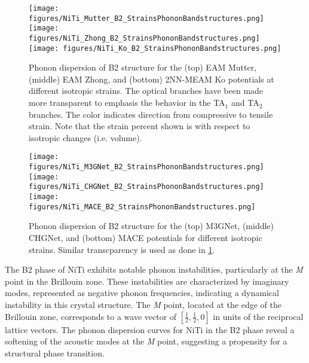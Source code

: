 \documentclass[preprint]{elsarticle}
\begin{document}
\begin{figure}[!htp]
    \begin{centering}
        \texttt{[image: figures/NiTi\_Mutter\_B2\_StrainsPhononBandstructures.png]}
        \vspace{1mm}
        \texttt{[image: figures/NiTi\_Zhong\_B2\_StrainsPhononBandstructures.png]}
        \vspace{1mm}
        \texttt{[image: figures/NiTi\_Ko\_B2\_StrainsPhononBandstructures.png]}
        \caption{
           Phonon dispersion of B2 structure for the  (top) EAM Mutter, (middle) EAM Zhong, and (bottom) 2NN-MEAM Ko potentials at different isotropic strains. The optical branches have been made more transparent to emphasis the behavior in the TA$_1$ and TA$_2$ branches. The color indicates direction from compressive to tensile strain. Note that the strain percent shown is with respect to isotropic changes (i.e. volume). 
        }
        \label{fig:mutter_zhong_phonon_b2}
    \end{centering}
\end{figure}



\begin{figure}[!htp]
    \begin{centering}
      \texttt{[image: figures/NiTi\_M3GNet\_B2\_StrainsPhononBandstructures.png]}
      \vspace{1mm}
      \texttt{[image: figures/NiTi\_CHGNet\_B2\_StrainsPhononBandstructures.png]}
      \vspace{1mm}
      \texttt{[image: figures/NiTi\_MACE\_B2\_StrainsPhononBandstructures.png]}
      \caption{
        Phonon dispersion of B2 structure for the (top) M3GNet, (middle) CHGNet, and (bottom) MACE potentials for different isotropic strains. Similar transcparency is used as done in \ref{fig:mutter_zhong_phonon_b2}.
      }
      \label{fig:gnn_phonon_b2}
    \end{centering}
\end{figure}


The B2 phase of NiTi exhibits notable phonon instabilities, particularly at the \textit{M} point in the Brillouin zone. These instabilities are characterized by imaginary modes, represented as negative phonon frequencies, indicating a dynamical instability in this crystal structure. The \textit{M} point, located at the edge of the Brillouin zone, corresponds to a wave vector of $\left[\frac{1}{2}, \frac{1}{2}, 0\right]$ in units of the reciprocal lattice vectors. The phonon dispersion curves for NiTi in the B2 phase reveal a softening of the acoustic modes at the \textit{M} point, suggesting a propensity for a structural phase transition. \par
\end{document}
